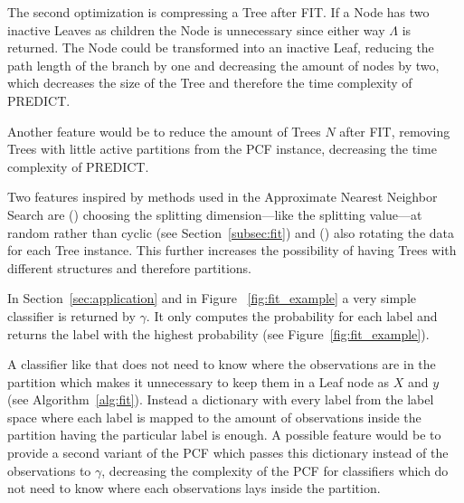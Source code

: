 The second optimization is compressing a Tree after FIT.
If a Node has two inactive Leaves as children the Node is
unnecessary since either way $\Lambda$ is returned. The
Node could be transformed into an inactive Leaf, reducing
the path length of the branch by one and decreasing the
amount of nodes by two, which decreases the size of the
Tree and therefore the time complexity of PREDICT.

Another feature would be to reduce the amount of Trees $N$
after FIT, removing Trees with little active partitions
from the PCF instance, decreasing the time complexity
of PREDICT.

Two features inspired by methods used in the Approximate
Nearest Neighbor Search are () choosing the
splitting dimension---like the splitting value---at
random rather than cyclic (see Section~\ref{subsec:fit})
and () also rotating the data for each Tree
instance.\cite[pages 17 - 27]{anns} This further increases
the possibility of having Trees with different structures
and therefore partitions.\cite[page 24]{anns}

In Section~\ref{sec:application} and in Figure~%
\ref{fig:fit_example} a very simple classifier is returned
by $\gamma$. It only computes the probability for each
label and returns the label with the highest probability
(see Figure~\ref{fig:fit_example}).

A classifier like that does not need to know where the
observations are in the partition which makes it
unnecessary to keep them in a Leaf node as $X$ and $y$
(see Algorithm~\ref{alg:fit}). Instead a dictionary with
every label from the label space where each label is mapped
to the amount of observations inside the partition having
the particular label is enough. A possible feature would be
to provide a second variant of the PCF which passes this
dictionary instead of the observations to $\gamma$,
decreasing the complexity of the PCF for classifiers which
do not need to know where each observations lays inside the
partition.
